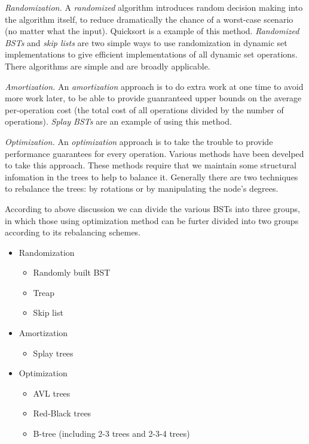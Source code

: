 \documentclass[12pt]{article}
\begin{document}
\emph{Randomization.}
    A {\em randomized} algorithm introduces random decision making into the
    algorithm itself, to reduce dramatically the chance of a worst-case
    scenario (no matter what the input).  Quicksort is a example of this
    method.  {\em Randomized BSTs} and {\em skip lists} are two simple ways to
    use randomization in dynamic set implementations to give efficient
    implementations of all dynamic set operations.  There algorithms are simple
    and are broadly applicable.

\emph{Amortization.}
    An {\em amortization} approach is to do extra work at one time to avoid
    more work later, to be able to provide guanranteed upper bounds on the
    average per-operation cost (the total cost of all operations divided by the
    number of operations).  {\em Splay BSTs} are an example of using this
    method.

\emph{Optimization.}
    An {\em optimization} approach is to take the trouble to provide
    performance guarantees for every operation.  Various methods have been
    develped to take this approach.  These methods require that we maintain
    some structural infomation in the trees to help to balance it.  Generally
    there are two techniques to rebalance the trees: by rotations or by
    manipulating the node's degrees.

According to above discussion we can divide the various BSTs into three
groups, in which those using optimization method can be furter divided into
two groups according to its rebalancing schemes.

\begin{itemize}
    \item Randomization
        \begin{itemize}
            \item Randomly built BST
            \item Treap
            \item Skip list
        \end{itemize}
    \item Amortization
        \begin{itemize}
            \item Splay trees
        \end{itemize}
    \item Optimization
        \begin{itemize}
            \item AVL trees
            \item Red-Black trees
            \item B-tree (including 2-3 trees and 2-3-4 trees)
        \end{itemize}
\end{itemize}
\end{document}
